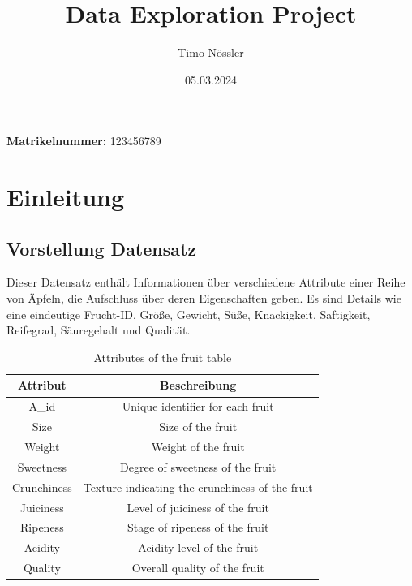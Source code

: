 \documentclass{article}
\title{\Huge Data Exploration Project}
\author{Timo Nössler}
\date{\vspace{2cm}05.03.2024}
\begin{document}
\clearpage\maketitle
\thispagestyle{empty}
\begin{center}
\textbf{Matrikelnummer:} 123456789
\end{center}
\newpage
\tableofcontents
\newpage


\section{Einleitung}
\subsection{Vorstellung Datensatz}
Dieser Datensatz enthält Informationen über verschiedene Attribute einer Reihe von Äpfeln, die Aufschluss über deren Eigenschaften geben. Es sind Details wie eine eindeutige Frucht-ID, Größe, Gewicht, Süße, Knackigkeit, Saftigkeit, Reifegrad, Säuregehalt und Qualität. 
\begin{table}[h]
\centering
\begin{tabular}{|c|c|}
\hline
\textbf{Attribut} & \textbf{Beschreibung} \\
\hline
A\_id & Unique identifier for each fruit \\
Size & Size of the fruit \\
Weight & Weight of the fruit \\
Sweetness & Degree of sweetness of the fruit \\
Crunchiness & Texture indicating the crunchiness of the fruit \\
Juiciness & Level of juiciness of the fruit \\
Ripeness & Stage of ripeness of the fruit \\
Acidity & Acidity level of the fruit \\
Quality & Overall quality of the fruit \\
\hline
\end{tabular}
\caption{Attributes of the fruit table}
\end{table}
\end{document}
